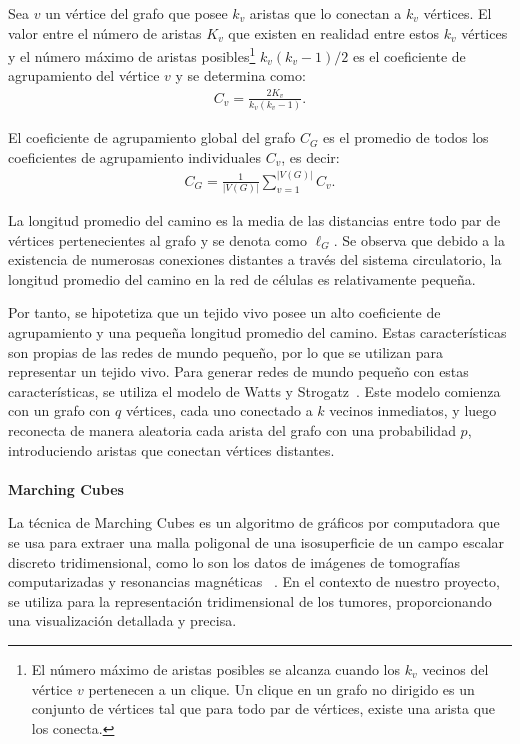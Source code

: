 \documentclass[a4paper,11pt]{article}
\begin{document}
{Sea $v$ un v\'ertice del grafo que posee $k_v$ aristas que lo conectan a $k_v$ v\'ertices. El valor entre el n\'umero de aristas $K_v$ que existen en realidad entre estos $k_v$ v\'ertices y el n\'umero m\'aximo de aristas posibles\footnote{El n\'umero m\'aximo de aristas posibles se alcanza cuando los $k_v$ vecinos del v\'ertice $v$ pertenecen a un clique. Un clique en un grafo no dirigido es un conjunto de v\'ertices tal que para todo par de v\'ertices, existe una arista que los conecta.} $k_v(k_v-1)/2$ es el coeficiente de agrupamiento del v\'ertice $v$ y se determina como:
\begin{align}
C_v = \displaystyle\frac{2K_v}{k_v(k_v-1)}. \label{eq-clustering}
\end{align}

El coeficiente de agrupamiento global del grafo $C_G$ es el promedio de todos los coeficientes de agrupamiento individuales $C_v$, es decir:
\begin{align}
C_G = \displaystyle\frac{1}{|V(G)|}\sum _{v=1} ^{|V(G)|} C_v. \label{eq-global-clustering}
\end{align}

La longitud promedio del camino es la media de las distancias entre todo par de v\'ertices pertenecientes al grafo y se denota como $\ell_G$. Se observa que debido a la existencia de numerosas conexiones distantes a través del sistema circulatorio, la longitud promedio del camino en la red de células es relativamente pequeña.

Por tanto, se hipotetiza que un tejido vivo posee un alto coeficiente de agrupamiento y una pequeña longitud promedio del camino. Estas características son propias de las redes de mundo pequeño, por lo que se utilizan para representar un tejido vivo. Para generar redes de mundo pequeño con estas características, se utiliza el modelo de Watts y Strogatz~\cite{31}. Este modelo comienza con un grafo con $q$ vértices, cada uno conectado a $k$ vecinos inmediatos, y luego reconecta de manera aleatoria cada arista del grafo con una probabilidad $p$, introduciendo aristas que conectan vértices distantes.\\
\\
\textbf{Marching Cubes}

La técnica de Marching Cubes es un algoritmo de gráficos por computadora que se usa para extraer una malla poligonal de una isosuperficie de un campo escalar discreto tridimensional, como lo son los datos de imágenes de tomografías computarizadas y resonancias magnéticas ~\cite{7}. En el contexto de nuestro proyecto, se utiliza para la representación tridimensional de los tumores, proporcionando una visualización detallada y precisa.

}
\end{document}
